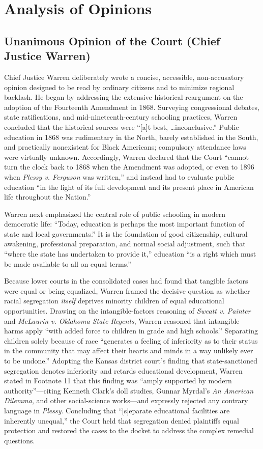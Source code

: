 \documentclass[12pt]{article}
\begin{document}
\section{Analysis of Opinions}

\subsection{Unanimous Opinion of the Court (Chief Justice Warren)}

Chief Justice Warren deliberately wrote a concise, accessible, non-accusatory opinion designed to be read by ordinary citizens and to minimize regional backlash. He began by addressing the extensive historical reargument on the adoption of the Fourteenth Amendment in 1868. Surveying congressional debates, state ratifications, and mid-nineteenth-century schooling practices, Warren concluded that the historical sources were ``[a]t best, \ldots inconclusive.'' Public education in 1868 was rudimentary in the North, barely established in the South, and practically nonexistent for Black Americans; compulsory attendance laws were virtually unknown. Accordingly, Warren declared that the Court ``cannot turn the clock back to 1868 when the Amendment was adopted, or even to 1896 when \textit{Plessy v. Ferguson} was written,'' and instead had to evaluate public education ``in the light of its full development and its present place in American life throughout the Nation.''

Warren next emphasized the central role of public schooling in modern democratic life: ``Today, education is perhaps the most important function of state and local governments.'' It is the foundation of good citizenship, cultural awakening, professional preparation, and normal social adjustment, such that ``where the state has undertaken to provide it,'' education ``is a right which must be made available to all on equal terms.''

Because lower courts in the consolidated cases had found that tangible factors were equal or being equalized, Warren framed the decisive question as whether racial segregation \textit{itself} deprives minority children of equal educational opportunities. Drawing on the intangible-factors reasoning of \textit{Sweatt v. Painter} and \textit{McLaurin v. Oklahoma State Regents}, Warren reasoned that intangible harms apply ``with added force to children in grade and high schools.'' Separating children solely because of race ``generates a feeling of inferiority as to their status in the community that may affect their hearts and minds in a way unlikely ever to be undone.'' Adopting the Kansas district court's finding that state-sanctioned segregation denotes inferiority and retards educational development, Warren stated in Footnote 11 that this finding was ``amply supported by modern authority''---citing Kenneth Clark's doll studies, Gunnar Myrdal's \textit{An American Dilemma}, and other social-science works---and expressly rejected any contrary language in \textit{Plessy}. Concluding that ``[s]eparate educational facilities are inherently unequal,'' the Court held that segregation denied plaintiffs equal protection and restored the cases to the docket to address the complex remedial questions.
\end{document}
